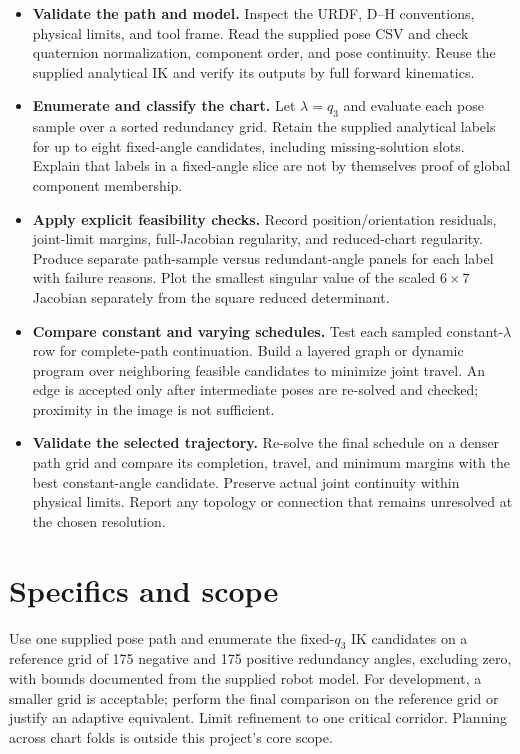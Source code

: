 \documentclass[11pt,a4paper]{article}
\begin{document}
\begin{itemize}
  \item \textbf{Validate the path and model.} Inspect the URDF, D--H conventions,
physical limits, and tool frame. Read the supplied pose CSV and check
quaternion normalization, component order, and pose continuity. Reuse the
supplied analytical IK and verify its outputs by full forward kinematics.

  \item \textbf{Enumerate and classify the chart.} Let $\lambda=q_3$ and evaluate
each pose sample over a sorted redundancy grid. Retain the supplied analytical
labels for up to eight fixed-angle candidates, including missing-solution
slots. Explain that labels in a fixed-angle slice are not by themselves
proof of global component membership.

  \item \textbf{Apply explicit feasibility checks.} Record position/orientation
residuals, joint-limit margins, full-Jacobian regularity, and reduced-chart
regularity. Produce separate path-sample versus redundant-angle panels for
each label with failure reasons. Plot the smallest singular value of the
scaled $6\times7$ Jacobian separately from the square reduced determinant.

  \item \textbf{Compare constant and varying schedules.} Test each sampled
constant-$\lambda$ row for complete-path continuation. Build a layered graph
or dynamic program over neighboring feasible candidates to minimize joint
travel. An edge is accepted only after intermediate poses are re-solved and
checked; proximity in the image is not sufficient.

  \item \textbf{Validate the selected trajectory.} Re-solve the final schedule on
a denser path grid and compare its completion, travel, and minimum margins
with the best constant-angle candidate. Preserve actual joint continuity
within physical limits. Report any topology or connection that remains
unresolved at the chosen resolution.
\end{itemize}

\newpage
\section*{Specifics and scope}
Use one supplied pose path and enumerate the fixed-$q_3$ IK candidates
on a reference grid of 175 negative and 175 positive redundancy angles,
excluding zero, with bounds documented from the supplied robot model.
For development, a smaller grid is acceptable; perform the final comparison
on the reference grid or justify an adaptive equivalent. Limit refinement
to one critical corridor. Planning across chart folds is outside this
project's core scope.
\end{document}
